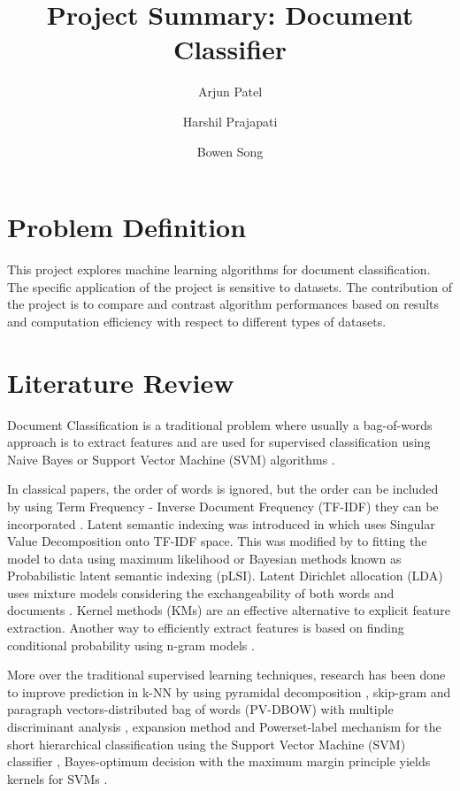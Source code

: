 \documentclass[a4paper, 11pt]{article}
\title{Project Summary: Document Classifier}
\author[1]{Arjun Patel}
\author[1]{Harshil Prajapati}
\author[1]{Bowen Song}
\affil[1]{Department of Electrical and Computer Engineering, Boston University}
\begin{document}
	\maketitle
	\section{Problem Definition}
	This project explores machine learning algorithms for document classification. The specific application of the project is sensitive to datasets. The contribution of the project is to compare and contrast algorithm performances based on results and computation efficiency with respect to different types of datasets.
	
	\section{Literature Review}
	Document Classification is a traditional problem where usually a bag-of-words approach is to extract features and are used for supervised classification using Naive Bayes or Support Vector Machine (SVM) algorithms \cite{sachan2018investigating}. 
	
	\hspace{15pt} In classical papers, the order of words is ignored, but the order can be included by using Term Frequency - Inverse Document Frequency (TF-IDF) they can be incorporated \cite{maes1995agents}. Latent semantic indexing was introduced in \cite{deerwester1990indexing} which uses Singular Value Decomposition onto TF-IDF space. This was modified by \cite{hofmann1999probabilistic} to fitting the model to data using maximum likelihood or Bayesian methods known as Probabilistic latent semantic indexing (pLSI). Latent Dirichlet allocation (LDA) uses mixture models considering the exchangeability of both words and documents \cite{blei2003latent}. Kernel methods (KMs) are an effective alternative to explicit feature extraction. Another way to efficiently extract features is based on finding conditional probability using n-gram models \cite{furnkranz1998study} .
	
	\hspace{15pt} More over the traditional supervised learning techniques, research has been done to improve prediction in k-NN by using pyramidal decomposition \cite{heroux1998classification},  skip-gram and paragraph vectors-distributed bag of words (PV-DBOW) with multiple discriminant analysis \cite{lauren2018discriminant}, expansion method and Powerset-label mechanism for the short hierarchical classification using the Support Vector Machine (SVM) classifier \cite{salih2018term}, Bayes-optimum decision with the maximum margin principle yields kernels for SVMs \cite{ding2014sensing}.
	
\end{document}
